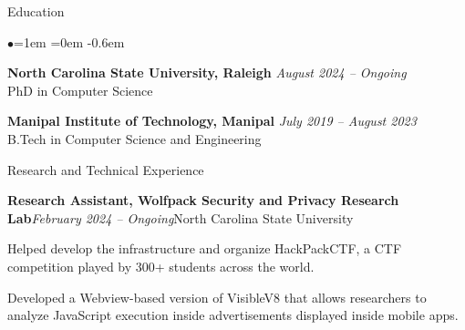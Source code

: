 \documentclass{resume} %
\date{\today}
\begin{document}
\begin{rSection}{Education}
\begin{list}{$\bullet$}{\leftmargin=1em \itemindent=0em}
\itemsep -0.6em
\item {\bf North Carolina State University, Raleigh} \hfill {\em August 2024 -- Ongoing}  \\ PhD in Computer Science\hfill
\item {\bf Manipal Institute of Technology, Manipal} \hfill {\em July 2019 -- August 2023}  \\ B.Tech in Computer Science and Engineering\hfill
\end{list}
\end{rSection}
\begin{rSection}{Research and Technical Experience}
\begin{rSubsection}{\bf Research Assistant, Wolfpack Security and Privacy Research Lab}{\em February 2024 -- Ongoing}{North Carolina State University}{}
\item Helped develop the infrastructure and organize HackPackCTF, a CTF competition played by 300+ students across the world.
\item Developed a Webview-based version of VisibleV8 that allows researchers to analyze JavaScript execution inside advertisements displayed inside mobile apps.


\end{rSubsection}
\end{rSection}
\end{document}
